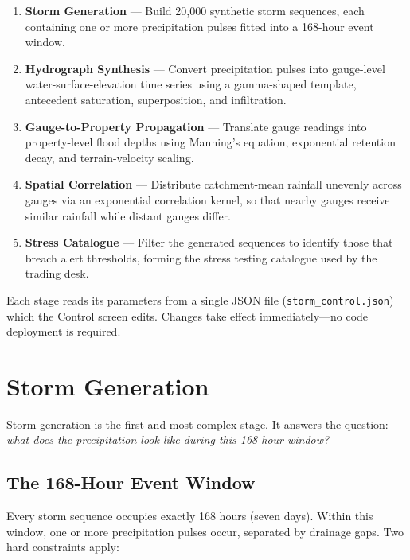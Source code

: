 \documentclass[11pt,a4paper]{article}
\begin{document}
\begin{enumerate}[leftmargin=2em]
  \item \textbf{Storm Generation} --- Build 20,000 synthetic storm
        sequences, each containing one or more precipitation pulses
        fitted into a 168-hour event window.
  \item \textbf{Hydrograph Synthesis} --- Convert precipitation pulses
        into gauge-level water-surface-elevation time series using a
        gamma-shaped template, antecedent saturation, superposition, and
        infiltration.
  \item \textbf{Gauge-to-Property Propagation} --- Translate gauge
        readings into property-level flood depths using Manning's
        equation, exponential retention decay, and terrain-velocity
        scaling.
  \item \textbf{Spatial Correlation} --- Distribute catchment-mean
        rainfall unevenly across gauges via an exponential correlation
        kernel, so that nearby gauges receive similar rainfall while
        distant gauges differ.
  \item \textbf{Stress Catalogue} --- Filter the generated sequences to
        identify those that breach alert thresholds, forming the stress
        testing catalogue used by the trading desk.
\end{enumerate}

\noindent Each stage reads its parameters from a single JSON file
(\texttt{storm\_control.json}) which the Control screen edits.  Changes
take effect immediately---no code deployment is required.


\section{Storm Generation}
\label{ch:storm_gen}

Storm generation is the first and most complex stage.  It answers the
question: \emph{what does the precipitation look like during this 168-hour
window?}

\subsection{The 168-Hour Event Window}

Every storm sequence occupies exactly 168 hours (seven days).  Within this
window, one or more precipitation pulses occur, separated by drainage gaps.
Two hard constraints apply:
\end{document}
